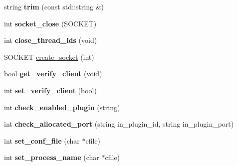 \begin{DoxyCompactItemize}
\item 
\hypertarget{classgeneric__server_ad9d2719d90f7529ffc2119bc8c6b548a}{string {\bfseries trim} (const std\-::string \&)}\label{classgeneric__server_ad9d2719d90f7529ffc2119bc8c6b548a}

\item 
\hypertarget{classgeneric__server_a1b319051165a40cfb76f89b780baa8d3}{int {\bfseries socket\-\_\-close} (S\-O\-C\-K\-E\-T)}\label{classgeneric__server_a1b319051165a40cfb76f89b780baa8d3}

\item 
\hypertarget{classgeneric__server_a88d6d9822018cba295f20d5414097f78}{int {\bfseries close\-\_\-thread\-\_\-ids} (void)}\label{classgeneric__server_a88d6d9822018cba295f20d5414097f78}

\item 
S\-O\-C\-K\-E\-T \hyperlink{classgeneric__server_a518621352c2fb76078cf56e41ca89606}{create\-\_\-socket} (int)
\item 
\hypertarget{classgeneric__server_a7ab863e0a9bbf8df13dfd7830b05f5ac}{bool {\bfseries get\-\_\-verify\-\_\-client} (void)}\label{classgeneric__server_a7ab863e0a9bbf8df13dfd7830b05f5ac}

\item 
\hypertarget{classgeneric__server_a14cb747bc30528c074113df8d2de90f0}{int {\bfseries set\-\_\-verify\-\_\-client} (bool)}\label{classgeneric__server_a14cb747bc30528c074113df8d2de90f0}

\item 
\hypertarget{classgeneric__server_aae24a7c5d70e28279ffbc22c5b038ca9}{int {\bfseries check\-\_\-enabled\-\_\-plugin} (string)}\label{classgeneric__server_aae24a7c5d70e28279ffbc22c5b038ca9}

\item 
\hypertarget{classgeneric__server_af498d05773d935dac207a224d4b09e25}{int {\bfseries check\-\_\-allocated\-\_\-port} (string in\-\_\-plugin\-\_\-id, string in\-\_\-plugin\-\_\-port)}\label{classgeneric__server_af498d05773d935dac207a224d4b09e25}

\item 
\hypertarget{classgeneric__server_a065818f8378c93da1fd5e65d96568283}{int {\bfseries set\-\_\-conf\-\_\-file} (char $\ast$cfile)}\label{classgeneric__server_a065818f8378c93da1fd5e65d96568283}

\item 
\hypertarget{classgeneric__server_a015bcfe7cea8059c614d9893a0b08b17}{int {\bfseries set\-\_\-process\-\_\-name} (char $\ast$cfile)}\label{classgeneric__server_a015bcfe7cea8059c614d9893a0b08b17}


\end{DoxyCompactItemize}

